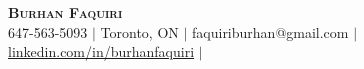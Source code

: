 \begin{center}
    \textbf{\Huge \scshape Burhan Faquiri} \\ \vspace{1pt}
    \small 647-563-5093 $|$ Toronto, ON $|$ {faquiriburhan@gmail.com} $|$ 
    \href{https://www.linkedin.com/in/burhanfaquiri}{\underline{linkedin.com/in/burhanfaquiri}} $|$ 
\end{center}
